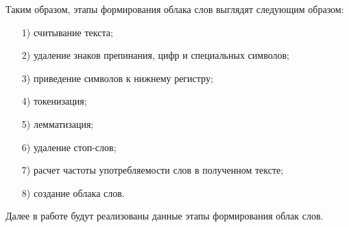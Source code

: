 \documentclass[bachelor, och, coursework ]{SCWorks}
\begin{document}
Таким образом, этапы формирования облака слов выглядят следующим образом: 
\begin{enumerate}
    \item[1)] считывание текста;
    \item[2)] удаление знаков препинания, цифр и специальных символов;		
    \item[3)] приведение символов к нижнему регистру;
    \item[4)] токенизация;
    \item[5)] лемматизация;
    \item[6)] удаление стоп-слов;
    \item[7)] расчет частоты употребляемости слов в полученном тексте;
    \item[8)] создание облака слов.
\end{enumerate}

Далее в работе будут реализованы данные этапы формирования облак слов.
\end{document}
